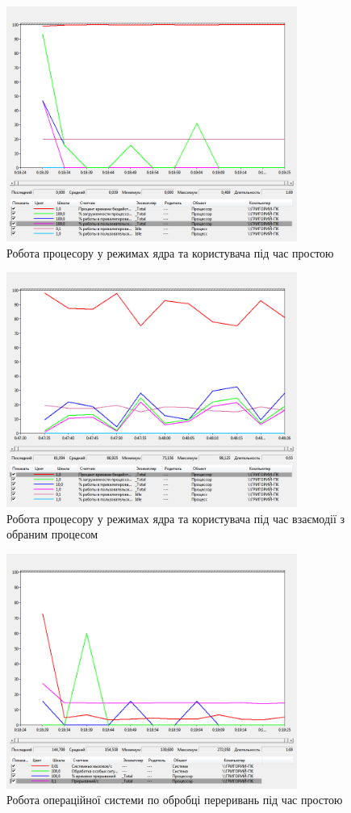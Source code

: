 \documentclass[12pt,a4paper]{article}
\begin{document}
\begin{figure}[b] \centering
    \includegraphics[width=0.8485\textwidth]{"processor/1.png"}
  \caption{Робота процесору у режимах ядра та користувача під час простою}
\end{figure}
\begin{figure} \centering
    \includegraphics[width=0.8485\textwidth]{"processor/2.png"}
  \caption{Робота процесору у режимах ядра та користувача під час взаємодії з обраним процесом}
\end{figure}
\begin{figure} \centering
    \includegraphics[width=0.8485\textwidth]{"interrupts/1.png"}
  \caption{Робота операційної системи по обробці переривань під час простою}
\end{figure}
\end{document}

